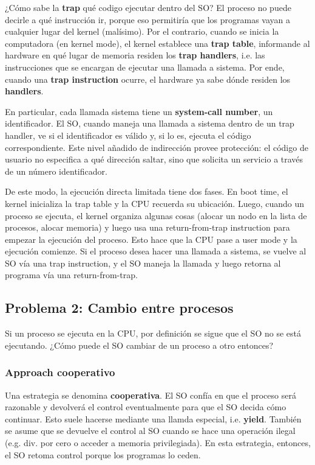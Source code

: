 \documentclass[12pt]{article}
\theoremstyle{definition}
\begin{document}
¿Cómo sabe la \textbf{trap} qué codigo ejecutar dentro del SO? El proceso no
puede decirle a qué instrucción ir, porque eso permitiría que los programas
vayan a cualquier lugar del kernel (malísimo). Por el contrario, cuando se
inicia la computadora (en kernel mode), el kernel establece una \textbf{trap
table}, informande al hardware en qué lugar de memoria residen los
\textbf{trap handlers}, i.e. las instrucciones que se encargan de ejecutar una
llamada a sistema. Por ende, cuando una \textbf{trap instruction} ocurre, el
hardware ya sabe dónde residen los \textbf{handlers}.

En particular, cada llamada sistema tiene un \textbf{system-call number}, un
identificador. El SO, cuando maneja una llamada a sistema dentro de un trap
handler, ve si el identificador es válido y, si lo es, ejecuta el código
correspondiente. Este nivel añadido de indirección provee protección: el código
de usuario no especifica a qué dirección saltar, sino que solicita un servicio a
través de un número identificador.

De este modo, la ejecución directa limitada tiene dos fases. En boot time, el
kernel inicializa la trap table y la CPU recuerda su ubicación. Luego, cuando un
proceso se ejecuta, el kernel organiza algunas cosas (alocar un nodo en la lista
de procesos, alocar memoria) y luego usa una return-from-trap instruction para
empezar la ejecución del proceso. Esto hace que la CPU pase a user mode y la
ejecución comienze. Si el proceso desea hacer una llamada a sistema, se vuelve
al SO vía una trap instruction, y el SO maneja la llamada y luego retorna al
programa vía una return-from-trap. 

\subsection{Problema 2: Cambio entre procesos}

Si un proceso se ejecuta en la CPU, por definición se sigue que el SO no se está
ejecutando. ¿Cómo puede el SO cambiar de un proceso a otro entonces? 

\subsubsection{Approach cooperativo}

Una estrategia se denomina \textbf{cooperativa}. El SO confía en que el proceso
será razonable y devolverá el control eventualmente para que el SO decida cómo
continuar. Esto suele hacerse mediante una llamda especial, i.e. \textbf{yield}.
También se asume que se devuelve el control al SO cuando se hace una operación
ilegal (e.g. div. por cero o acceder a memoria privilegiada). En esta
estrategia, entonces, el SO retoma control porque los programas lo ceden.
\end{document}
